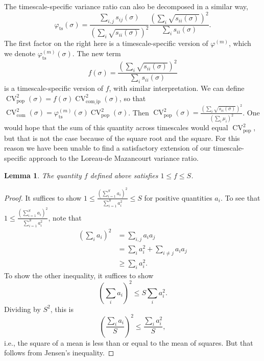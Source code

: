 \documentclass[letterpaper,11pt]{article}
\newcommand{\CV}{{\operatorname{CV}}}
\newcommand{\com}{{\operatorname{com}}}
\newcommand{\comip}{{\operatorname{com\_ip}}}
\newcommand{\pop}{{\operatorname{pop}}}
\newtheorem{lemma}[theorem]{Lemma}
\begin{document}
The timescale-specific variance ratio can also be decomposed in a similar way,
\begin{equation}
\varphi_{\text{ts}}(\sigma)=\frac{\sum_{i,j}s_{ij}(\sigma)}{(\sum_i \sqrt{s_{ii}(\sigma)})^2}
\frac{(\sum_i \sqrt{s_{ii}(\sigma)})^2}{\sum_i s_{ii}(\sigma)}.
\end{equation}
The first factor on the right here is a timescale-specific version of 
$\varphi^{(m)}$, which we denote $\varphi_{\text{ts}}^{(m)}(\sigma)$. The new term
\begin{equation}
f(\sigma)=\frac{(\sum_i \sqrt{s_{ii}(\sigma)})^2}{\sum_i s_{ii}(\sigma)}
\end{equation}
is a timescale-specific version of $f$, with similar interpretation. We can define 
$\CV_{\pop}^2(\sigma)=f(\sigma) \CV_{\comip}^2 (\sigma)$, so that 
$\CV_{\com}^2(\sigma) = \varphi_{\text{ts}}^{(m)}(\sigma) \CV_{\pop}^2(\sigma)$.
Then $\CV_{\pop}^2(\sigma)=\frac{\left( \sum_i \sqrt{s_{ii}(\sigma)} \right)^2}{\left( \sum_i \mu_i  \right)^2}$. One would hope that the sum of this quantity across
timescales would equal $\CV_{\pop}^2$, but that is not the case because of the square root
and the square.
For this reason we have been unable to find a satisfactory extension of our 
timescale-specific approach to the Loreau-de Mazancourt variance ratio.

\begin{lemma}\label{lemJenson}
The quantity $f$ defined above satisfies $1 \leq f \leq S$.
\end{lemma}
\begin{proof}
\noindent It suffices to show 
$1 \leq \frac{(\sum_{i=1}^S a_i)^2}{\sum_{i=1}^S a_i^2} \leq S$
for positive quantities $a_i$. To see that 
$1 \leq \frac{(\sum_{i=1}^S a_i)^2}{\sum_{i=1}^S a_i^2}$, note that
\begin{align}
\left(\sum_i a_i \right)^2 &= \sum_{i,j} a_i a_j \\
 &= \sum_i a_i^2 + \sum_{i \neq j} a_i a_j \\
 &\geq \sum_i a_i^2.
\end{align}
To show the other inequality, it suffices to show
\begin{equation}
\left( \sum_i a_i  \right)^2 \leq S \sum_i a_i^2.
\end{equation}
Dividing by $S^2$, this is
\begin{equation}
\left( \frac{\sum_i a_i}{S}  \right)^2 \leq  \frac{\sum_i a_i^2}{S},
\end{equation}
i.e., the square of a mean is less than or equal to the mean of squares.
But that follows from Jensen's inequality.
\end{proof}
\end{document}
